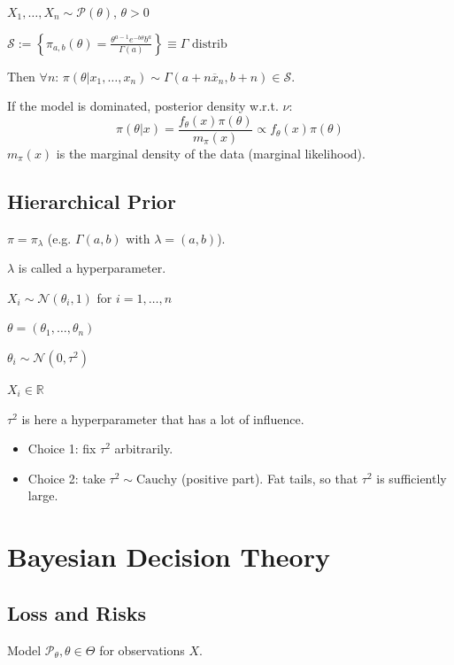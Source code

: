 \documentclass[11pt, a4paper]{article}
\begin{document}
\begin{example}
$X_1, \dots, X_n \sim \mathcal{P}(\theta)$, $\theta > 0$

$\mathcal{S} := \left\{ \pi_{a,b}(\theta) = \frac{\theta^{a-1}e^{-b\theta}b^a}{\Gamma(a)} \right\} \equiv \Gamma \text{ distrib}$

Then $\forall n$: $\pi(\theta | x_1, \dots, x_n) \sim \Gamma\left(a + n\overline{x}_n, b + n\right) \in \mathcal{S}.$
\end{example}

If the model is dominated, posterior density w.r.t. $\nu$:
\[ \pi(\theta|x) = \frac{f_\theta(x)\pi(\theta)}{m_\pi(x)} \propto f_\theta(x)\pi(\theta) \]
$m_\pi(x)$ is the marginal density of the data (marginal likelihood).

\subsection{Hierarchical Prior}
$\pi = \pi_\lambda$ (e.g. $\Gamma(a, b)$ with $\lambda = (a,b)$).

$\lambda$ is called a hyperparameter.

\begin{example}
$X_i \sim \mathcal{N}(\theta_i, 1)$ for $i=1, \dots, n$

$\theta = (\theta_1, \dots, \theta_n)$

$\theta_i \sim \mathcal{N}(0, \tau^2)$

$X_i \in \mathbb{R}$

$\tau^2$ is here a hyperparameter that has a lot of influence. 
\begin{itemize}
    \item Choice 1: fix $\tau^2$ arbitrarily.
    \item Choice 2: take $\tau^2 \sim \text{Cauchy}$ (positive part). Fat tails, so that $\tau^2$ is sufficiently large.
\end{itemize}
\end{example}

\section{Bayesian Decision Theory}

\subsection{Loss and Risks}
Model $\mathcal{P}_\theta, \theta \in \Theta$ for observations $X$.
\end{document}
